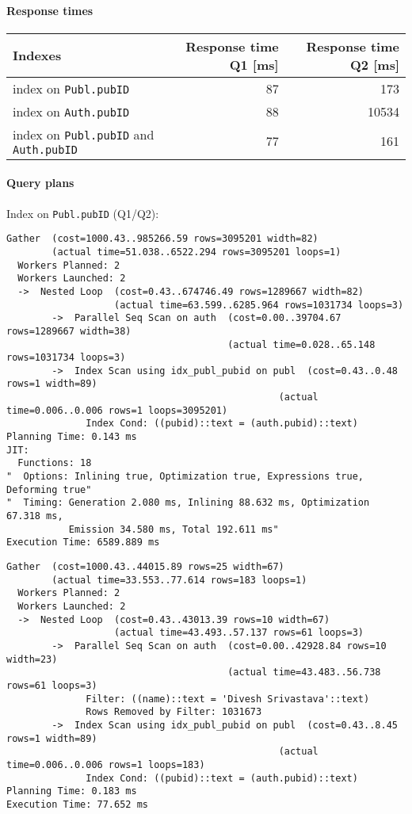 \documentclass[11pt]{scrartcl}
\begin{document}
\paragraph{Response times}\mbox{}

\begin{table}[H]
  \centering
  \begin{tabular}{l|r|r}
    Indexes & Response time Q1 [ms] & Response time Q2 [ms] \tabularnewline
    \hline
    index on \texttt{Publ.pubID} & 87 & 173 \tabularnewline
    index on \texttt{Auth.pubID} & 88 & 10534 \tabularnewline
    index on \texttt{Publ.pubID} and \texttt{Auth.pubID} & 77 & 161
        \tabularnewline
  \end{tabular}
\end{table}

\paragraph{Query plans}\mbox{}

Index on \texttt{Publ.pubID} (Q1/Q2):

{\small
\parskip0pt\begin{verbatim}
Gather  (cost=1000.43..985266.59 rows=3095201 width=82)
        (actual time=51.038..6522.294 rows=3095201 loops=1)
  Workers Planned: 2
  Workers Launched: 2
  ->  Nested Loop  (cost=0.43..674746.49 rows=1289667 width=82)
                   (actual time=63.599..6285.964 rows=1031734 loops=3)
        ->  Parallel Seq Scan on auth  (cost=0.00..39704.67 rows=1289667 width=38)
                                       (actual time=0.028..65.148 rows=1031734 loops=3)
        ->  Index Scan using idx_publ_pubid on publ  (cost=0.43..0.48 rows=1 width=89)
                                                (actual time=0.006..0.006 rows=1 loops=3095201)
              Index Cond: ((pubid)::text = (auth.pubid)::text)
Planning Time: 0.143 ms
JIT:
  Functions: 18
"  Options: Inlining true, Optimization true, Expressions true, Deforming true"
"  Timing: Generation 2.080 ms, Inlining 88.632 ms, Optimization 67.318 ms,
           Emission 34.580 ms, Total 192.611 ms"
Execution Time: 6589.889 ms
\end{verbatim}}

  {\small
\parskip0pt\begin{verbatim}
Gather  (cost=1000.43..44015.89 rows=25 width=67)
        (actual time=33.553..77.614 rows=183 loops=1)
  Workers Planned: 2
  Workers Launched: 2
  ->  Nested Loop  (cost=0.43..43013.39 rows=10 width=67)
                   (actual time=43.493..57.137 rows=61 loops=3)
        ->  Parallel Seq Scan on auth  (cost=0.00..42928.84 rows=10 width=23)
                                       (actual time=43.483..56.738 rows=61 loops=3)
              Filter: ((name)::text = 'Divesh Srivastava'::text)
              Rows Removed by Filter: 1031673
        ->  Index Scan using idx_publ_pubid on publ  (cost=0.43..8.45 rows=1 width=89)
                                                (actual time=0.006..0.006 rows=1 loops=183)
              Index Cond: ((pubid)::text = (auth.pubid)::text)
Planning Time: 0.183 ms
Execution Time: 77.652 ms
\end{verbatim}}
\end{document}

